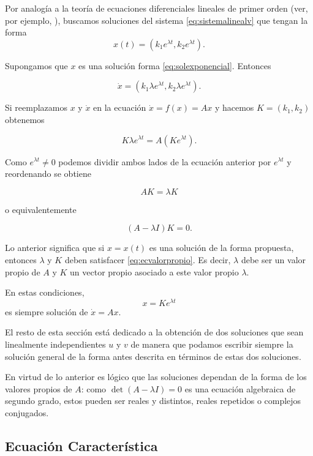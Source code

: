 \documentclass[11pt]{book}
\theoremstyle{definition}
\numberwithin{definition}{section}
\theoremstyle{theorem}
\numberwithin{theorem}{section}
\numberwithin{lemma}{section}
\numberwithin{corollary}{section}
\theoremstyle{plain}
\numberwithin{example}{section}
\begin{document}
Por analogía a la teoría de ecuaciones diferenciales lineales de primer orden (ver, por ejemplo, \cite{zillcull,boycediprima}), buscamos soluciones del sistema \ref{eq:sistemalinealv} que tengan la forma
\begin{equation} \label{eq:solexponencial}
x(t) = (k_1e^{\lambda t}, k_2e^{\lambda t}).
\end{equation}

Supongamos que $x$ es una solución forma \ref{eq:solexponencial}. Entonces

$$ \dot{x} = (k_1 \lambda e^{\lambda t}, k_2 \lambda e^{\lambda t}). $$

Si reemplazamos $x$ y $\dot{x}$ en la ecuación $\dot{x} = f(x) = Ax$ y hacemos $K = (k_1, k_2)$ obtenemos

$$
	K \lambda e^{\lambda t} = A (Ke^{\lambda t}).
$$

Como $e^{\lambda t} \neq 0$ podemos dividir ambos lados de la ecuación anterior por $e^{\lambda t}$ y reordenando se obtiene

$$ AK = \lambda K$$

o equivalentemente

\begin{equation} \label{eq:ecvalorpropio}
	(A - \lambda I) K = 0.
\end{equation}

Lo anterior significa que si $x = x(t)$ es una solución de la forma propuesta, entonces $\lambda$ y $K$ deben satisfacer \ref{eq:ecvalorpropio}. Es decir, $\lambda$ debe ser un valor propio de $A$ y $K$ un vector propio asociado a este valor propio $\lambda$.

En estas condiciones, $$ x = K e^{\lambda t}$$ es siempre solución de $\dot{x} = Ax$.

El resto de esta sección está dedicado a la obtención de dos soluciones que sean linealmente independientes $u$ y $v$ de manera que podamos escribir siempre la solución general de la forma antes descrita en términos de estas dos soluciones.

En virtud de lo anterior es lógico que las soluciones dependan de la forma de los valores propios de $A$: como $\det(A - \lambda I) = 0$ es una ecuación algebraica de segundo grado, estos pueden ser reales y distintos, reales repetidos o complejos conjugados.

\subsection{Ecuación Característica}
\end{document}
